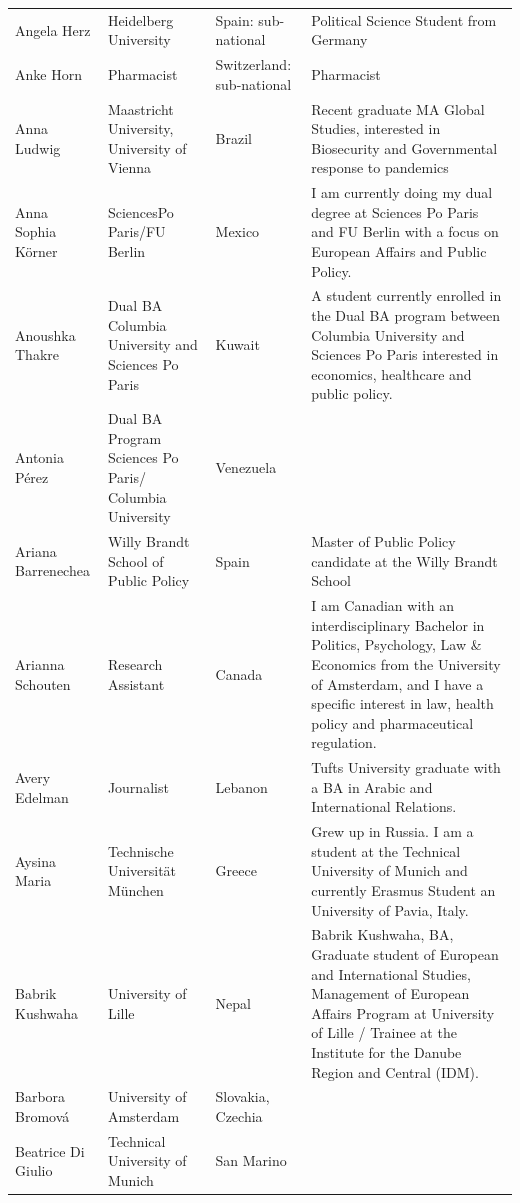 \documentclass[]{article}
\begin{document}
\begin{longtable}{l>{\raggedright\arraybackslash}p{2cm}>{\raggedright\arraybackslash}p{2cm}>{\raggedright\arraybackslash}p{3cm}}
\rowcolor{gray!6}  Angela Herz & Heidelberg University & Spain: sub-national & Political Science Student from Germany\\
Anke Horn & Pharmacist & Switzerland: sub-national & Pharmacist\\
\rowcolor{gray!6}  Anna Ludwig & Maastricht University, University of Vienna & Brazil & Recent graduate MA Global Studies, interested in Biosecurity and Governmental response to pandemics\\
\addlinespace
Anna Sophia Körner & SciencesPo Paris/FU Berlin & Mexico & I am currently doing my dual degree at Sciences Po Paris and FU Berlin with a focus on European Affairs and Public Policy.\\
\rowcolor{gray!6}  Anoushka Thakre & Dual BA Columbia University and Sciences Po Paris & Kuwait & A student currently enrolled in the Dual BA program between Columbia University and Sciences Po Paris interested in economics, healthcare and public policy.\\
Antonia Pérez & Dual BA Program Sciences Po Paris/ Columbia University & Venezuela & \\
\rowcolor{gray!6}  Ariana Barrenechea & Willy Brandt School of Public Policy & Spain & Master of Public Policy candidate at the Willy Brandt School\\
Arianna Schouten & Research Assistant & Canada & I am Canadian with an interdisciplinary Bachelor in Politics, Psychology, Law \& Economics from the University of Amsterdam, and I have a specific interest in law, health policy and pharmaceutical regulation.\\
\addlinespace
\rowcolor{gray!6}  Avery Edelman & Journalist & Lebanon & Tufts University graduate with a BA in Arabic and International Relations.\\
Aysina Maria & Technische Universität München & Greece & Grew up in Russia. I am a student at the Technical University of Munich and currently Erasmus Student an University of Pavia, Italy.\\
\rowcolor{gray!6}  Babrik Kushwaha & University of Lille & Nepal & Babrik Kushwaha, BA, Graduate student of European and International Studies, Management of European Affairs Program at University of Lille / Trainee at the Institute for the Danube Region and Central (IDM).\\
Barbora Bromová & University of Amsterdam & Slovakia, Czechia & \\
\rowcolor{gray!6}  Beatrice Di Giulio & Technical University of Munich & San Marino & \\

\end{longtable}
\end{document}
